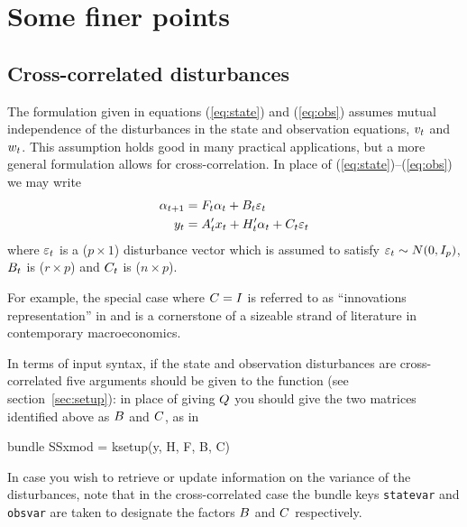 
\section{Some finer points}
\label{sec:finer}

\subsection{Cross-correlated disturbances}
\label{sec:crossd}

The formulation given in equations (\ref{eq:state}) and (\ref{eq:obs})
assumes mutual independence of the disturbances in the state and
observation equations, $v_t$ and $w_t$.  This assumption
holds good in many practical applications, but a more general
formulation allows for cross-correlation.  In place of
(\ref{eq:state})--(\ref{eq:obs}) we may write
%
\begin{align*}
  \alpha_{t+1} &= F_t \alpha_t + 
     B_t \varepsilon_t \\
  y_t &= A_t'x_t + H_t' \alpha_t + 
     C_t \varepsilon_t 
\end{align*}
%
where $\varepsilon_t$ is a ($p \times 1$) disturbance vector which is
assumed to satisfy $\varepsilon_t \sim N(0, I_p)$, $B_t$ is
($r \times p$) and $C_t$ is ($n \times p$).

For example, the special case where $C = I$ is referred to as
``innovations representation'' in \cite{hansen-sargent2013} and is a
cornerstone of a sizeable strand of literature in contemporary
macroeconomics.

In terms of input syntax, if the state and observation disturbances
are cross-correlated five arguments should be given to the
 function (see section~\ref{sec:setup}): in place of
giving $Q$ you should give the two matrices identified above as
$B$ and $C$, as in
\begin{code}
bundle SSxmod = ksetup(y, H, F, B, C)
\end{code}

In case you wish to retrieve or update information on the variance of
the disturbances, note that in the cross-correlated case the bundle
keys \texttt{statevar} and \texttt{obsvar} are taken to designate the
factors $B$ and $C$ respectively.


